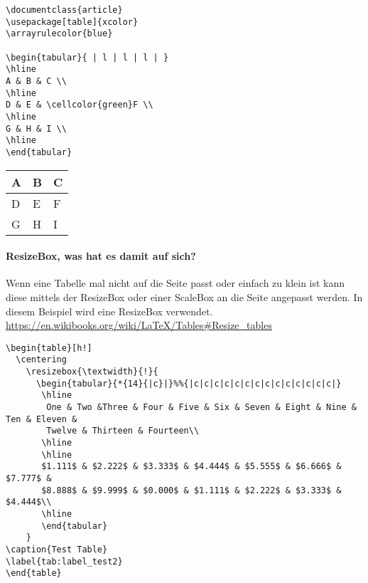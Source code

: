 \begin{lstlisting}[style=LaTeX,caption={Einfache Tabelle mit Einfärbung von Zellen},label=lst:tab9]
\documentclass{article}
\usepackage[table]{xcolor}
\arrayrulecolor{blue}

\begin{tabular}{ | l | l | l | }
\hline
A & B & C \\
\hline
D & E & \cellcolor{green}F \\
\hline
G & H & I \\
\hline
\end{tabular}

\end{lstlisting}


\begin{tabular}{ | l | l | l | }
	\hline
	A & B & C \\
	\hline
	D & E & \cellcolor{green}F \\
	\hline
	G & H & I \\
	\hline
\end{tabular}
\paragraph{ResizeBox, was hat es damit auf sich?}
Wenn eine Tabelle mal nicht auf die Seite passt oder einfach zu klein ist kann diese mittels der ResizeBox oder einer ScaleBox an die Seite angepasst werden. In diesem Beispiel wird eine ResizeBox verwendet. \url{https://en.wikibooks.org/wiki/LaTeX/Tables#Resize_tables}

\begin{lstlisting}[style=LaTeX,caption={Beispiel für ResizeBox},label=lst:tab10]
\begin{table}[h!]
  \centering
    \resizebox{\textwidth}{!}{
      \begin{tabular}{*{14}{|c}|}%%{|c|c|c|c|c|c|c|c|c|c|c|c|c|c|}
       \hline
        One & Two &Three & Four & Five & Six & Seven & Eight & Nine & Ten & Eleven &
        Twelve & Thirteen & Fourteen\\
       \hline
       \hline
       $1.111$ & $2.222$ & $3.333$ & $4.444$ & $5.555$ & $6.666$ & $7.777$ &
       $8.888$ & $9.999$ & $0.000$ & $1.111$ & $2.222$ & $3.333$ & $4.444$\\
       \hline
       \end{tabular}
    }
\caption{Test Table}
\label{tab:label_test2}
\end{table}
\end{lstlisting}

	\begin{table}[h!]
		\centering
		\caption{Test Table}
		\label{tab:label_test}
	\end{table}
